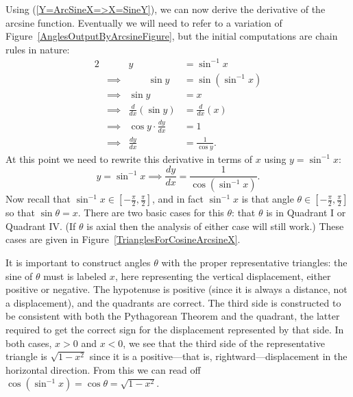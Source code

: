Using (\ref{Y=ArcSineX=>X=SineY}), we can now derive the
derivative of the arcsine function.  Eventually we will need
to refer to a variation of Figure~\ref{AnglesOutputByArcsineFigure},
but the initial computations are chain rules in nature:
\begin{alignat*}{2}
&&y&=\sin^{-1}x\\
&\implies&\qquad \sin y&=\sin(\sin^{-1}x)\\
&\implies&       \sin y&=x\\
&\implies& \frac{d}{dx}(\sin y)&=\frac{d}{dx}(x)\\
&\implies&\cos y\cdot\frac{dy}{dx}&=1\\
&\implies&\frac{dy}{dx}&=\frac1{\cos y}.
\end{alignat*}
At this point we need to rewrite this derivative in terms of $x$
using $y=\sin^{-1}x$:
\begin{equation}
y=\sin^{-1}x\implies \frac{dy}{dx}=\frac1{\cos (\sin^{-1}x)}.
\label{IntermediateStepToArcsineDerivative}
\end{equation}
Now recall that $\sin^{-1}x\in\left[-\frac{\pi}2,\frac{\pi}2\right]$,
and in fact $\sin^{-1}x$ is that angle $\theta\in
\left[-\frac{\pi}2,\frac{\pi}2\right]$ so that $\sin\theta=x$.
There are two basic cases for this $\theta$: that $\theta$ is in
Quadrant I or Quadrant IV. (If $\theta$ is axial then the analysis
of either case will still work.)
These cases are given in Figure~\ref{TrianglesForCosineArcsineX}.


It is important to construct angles $\theta$ with the
proper representative triangles: the sine of $\theta$
must is labeled $x$,  here representing the vertical
displacement, either positive or negative. 
The hypotenuse is positive (since it is always a distance,
not a displacement), and the quadrants are correct.
The third side is constructed to be consistent with
both the Pythagorean Theorem
and the quadrant, the latter required to get the correct sign
for the displacement represented by that side.
In both cases, $x>0$ and $x<0$, we see that the third side 
of the representative triangle is $\sqrt{1-x^2}$
since it is a positive---that is, rightward---displacement
in the horizontal direction.  From this we can
read off $\cos(\sin^{-1}x)=\cos\theta=\sqrt{1-x^2}$.

